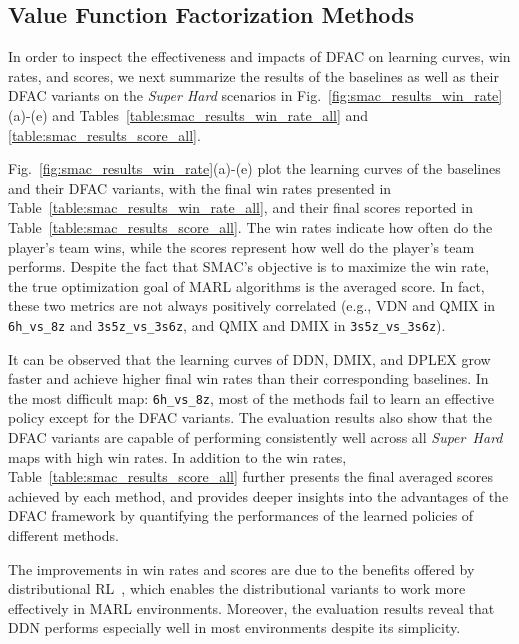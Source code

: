\documentclass[twoside,11pt]{article}
\newcommand{\superhard}{\textit{Super~Hard}}
\newcommand{\ddn}{DDN}
\newcommand{\dmix}{DMIX}
\newcommand{\dplex}{DPLEX}
\begin{document}
\subsection{Value Function Factorization Methods}
\label{subsec:experiment_results_super_hard}

In order to inspect the effectiveness and impacts of DFAC on learning curves, win rates, and scores, we next summarize the results of the baselines as well as their DFAC variants on the \textit{Super Hard} scenarios in Fig.~\ref{fig:smac_results_win_rate}(a)-(e) and Tables~\ref{table:smac_results_win_rate_all} and \ref{table:smac_results_score_all}.

Fig.~\ref{fig:smac_results_win_rate}(a)-(e) plot the learning curves of the baselines and their DFAC variants, with the final win rates presented in Table~\ref{table:smac_results_win_rate_all}, and their final scores reported in Table~\ref{table:smac_results_score_all}. The win rates indicate how often do the player's team wins, while the scores represent how well do the player's team performs. Despite the fact that SMAC's objective is to maximize the win rate, the true optimization goal of MARL algorithms is the averaged score. In fact, these two metrics are not always positively correlated (e.g., VDN and QMIX in \texttt{6h\_vs\_8z} and \texttt{3s5z\_vs\_3s6z}, and QMIX and \dmix{} in \texttt{3s5z\_vs\_3s6z}).

It can be observed that the learning curves of \ddn{}, \dmix{}, and \dplex{} grow faster and achieve higher final win rates than their corresponding baselines. In the most difficult map: \texttt{6h\_vs\_8z}, most of the methods fail to learn an effective policy except for the DFAC variants. The evaluation results also show that the DFAC variants are capable of performing consistently well across all \superhard{} maps with high win rates. In addition to the win rates, Table~\ref{table:smac_results_score_all} further presents the final averaged scores achieved by each method, and provides deeper insights into the advantages of the DFAC framework by quantifying the performances of the learned policies of different methods.

The improvements in win rates and scores are due to the benefits offered by distributional RL~\citep{Lyle2019Comparative}, which enables the distributional variants to work more effectively in MARL environments. Moreover, the evaluation results reveal that \ddn{} performs especially well in most environments despite its simplicity.
\end{document}
